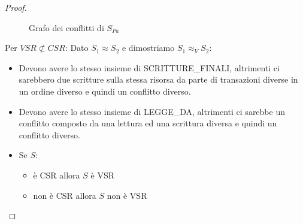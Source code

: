 \documentclass[a4paper]{article}
\begin{document}
\begin{proof}
\begin{itemize}
\begin{figure}[H]
      \caption{Grafo dei conflitti di \( S_{Pa} \)}
    \end{figure}
\end{itemize}
Per $VSR \not\subset CSR$:
Dato $S_1 \approx S_2$ e dimostriamo $S_1 \approx_V S_2$:
\begin{itemize}
  \item Devono avere lo stesso insieme di 
  SCRITTURE\_FINALI, altrimenti ci sarebbero due scritture sulla stessa risorsa da
  parte di transazioni diverse in un ordine diverso e quindi un conflitto diverso.
  \item Devono avere lo stesso insieme di LEGGE\_DA, altrimenti ci sarebbe un conflitto
  composto da una lettura ed una scrittura diversa e quindi 
  un conflitto diverso.  
  \item Se $S$:
  \begin{itemize}
    \item è CSR allora $S$ è VSR 
    \item non è CSR allora $S$ non è VSR
  \end{itemize}
  \end{itemize}
\end{proof}
\noindent
\end{document}
